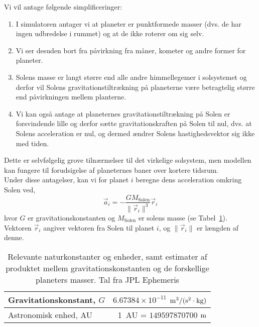 \documentclass{article}
\begin{document}
\begin{enumerate}[label=11g.\arabic*,start=0]
Vi vil antage følgende simplificeringer: 
\begin{enumerate}
\item I simulatoren antager vi at planeter er punktformede masser (dvs. de har ingen udbredelse i rummet) og at de ikke roterer om sig selv.
\item Vi ser desuden bort fra påvirkning fra måner, kometer og andre former for planeter.
\item Solens masse er langt større end alle andre himmellegemer i solsystemet og derfor vil Solens gravitationstiltrækning på planeterne være betragtelig større end påvirkningen mellem planterne.
\item Vi kan også antage at planeternes gravitationstiltrækning på Solen er forsvindende lille og derfor sætte gravitationskraften på Solen til nul, dvs. at Solens acceleration er nul, og dermed ændrer Solens hastighedsvektor sig ikke med tiden.
\end{enumerate}
Dette er selvfølgelig grove tilnærmelser til det virkelige solsystem, men modellen kan fungere til forudsigelse af planeternes baner over kortere tidsrum.\\
Under disse antagelser, kan vi for planet $i$ beregne dens acceleration omkring Solen ved,
\begin{equation}
  \label{eq:2-gravitationalacceleration}
  \vec{a}_i = - \frac{G M_{\mathrm{Solen}} }{\|\vec{r}_i \|^3} \vec{r}_i
\end{equation}
hvor $G$ er gravitationskonstanten og $M_{\mathrm{Solen}}$ er solens masse (se Tabel~\ref{tab:constants}). Vektoren $\vec{r}_i$ angiver vektoren fra Solen til planet $i$, og $\| \vec{r}_i\|$ er længden af denne. 
\begin{table}
  \caption{Relevante naturkonstanter og enheder, samt estimater af produktet mellem gravitationskonstanten og de forskellige planeters masser. Tal fra JPL Ephemeris \cite{JPL}} \label{tab:constants}
  \begin{center}
    \begin{tabular}{|l|r|}
      \hline
      Gravitationskonstant, $G$ & $6.67384 \times 10^{-11}$ $\meter^3 / (\second^2 \cdot \mass)$ \\ \hline
      Astronomisk enhed, AU & 1~AU = $149597870700$ $\meter$ \\ \hline

\end{tabular}
\end{center}
\end{table}
\end{enumerate}
\end{document}

